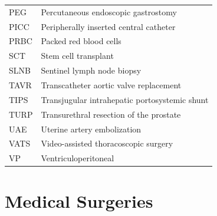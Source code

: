 \documentclass[12pt,oneside]{book}
\begin{document}
\begin{footnotesize}
\begin{longtable}{@{}ll@{}}
PEG & Percutaneous endoscopic gastrostomy \\
PICC & Peripherally inserted central catheter \\
PRBC & Packed red blood cells \\
SCT & Stem cell transplant \\
SLNB & Sentinel lymph node biopsy \\
TAVR & Transcatheter aortic valve replacement \\
TIPS & Transjugular intrahepatic portosystemic shunt \\
TURP & Transurethral resection of the prostate \\
UAE & Uterine artery embolization \\
VATS & Video-assisted thoracoscopic surgery \\
VP & Ventriculoperitoneal \\
\bottomrule
\end{longtable}
\end{footnotesize}

\mainmatter

\part{Medical Surgeries}
\end{document}

